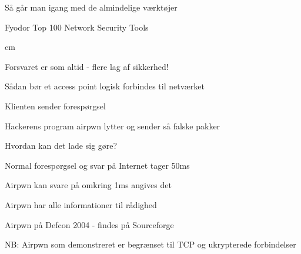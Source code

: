 \documentclass[Screen16to9,17pt]{foils}
\begin{document}

\begin{list1}
\item Så går man igang med de almindelige værktøjer
\item Fyodor Top 100 Network Security Tools 
\end{list1}
 cm

\centerline{\hlkbig Forsvaret er som altid - flere lag af sikkerhed! }



\centerline{\hlkbig Sådan bør et access point logisk forbindes til netværket}








\begin{list1}
\item Klienten sender forespørgsel
\item Hackerens program airpwn lytter og sender så falske pakker
\item Hvordan kan det lade sig gøre?
\begin{list2}
\item Normal forespørgsel og svar på Internet tager 50ms
\item Airpwn kan svare på omkring 1ms angives det
\item Airpwn har alle informationer til rådighed
\end{list2}
\item Airpwn på Defcon 2004 - findes på Sourceforge\\
\item NB: Airpwn som demonstreret er begrænset til TCP og ukrypterede
  forbindelser
\end{list1}


\end{document}
